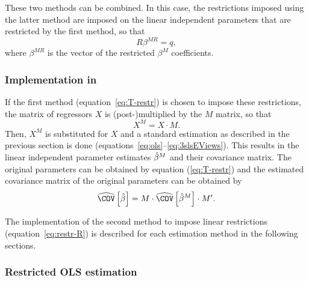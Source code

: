 These two methods can be combined.
In this case, the restrictions imposed using the latter method are
imposed on the linear independent parameters
that are restricted by the first method, so that
\begin{equation}
   R \beta^{MR} = q ,
\end{equation}
where $\beta^{MR}$ is the vector of the restricted $\beta^M$ coefficients.


\subsubsection[Implementation in systemfit]{Implementation in }

If the first method (equation~\ref{eq:T-restr}) is chosen
to impose these restrictions,
the matrix of regressors $X$ is (post-)\hspace{0pt}multiplied
by the $M$ matrix,
so that
\begin{equation}
    X^M = X \cdot M .
\end{equation}
Then, $X^M$ is substituted for $X$ and a standard estimation as described
in the previous section is done
(equations~\ref{eq:ols}--\ref{eq:3slsEViews}).
This results in the linear independent parameter estimates $\hat{\beta}^M$ and
their covariance matrix.
The original parameters can be obtained by equation (\ref{eq:T-restr})
and the estimated covariance matrix of the original parameters
can be obtained by
\begin{equation}
   \COVHat \left[ \bHat \right]
   = M \cdot \COVHat \left[ \bHat^M \right] \cdot M' .
\end{equation}

The implementation of the second method to impose linear restrictions
(equation~\ref{eq:restr-R})
is described for each estimation method in the following sections.


\subsubsection{Restricted OLS estimation}

